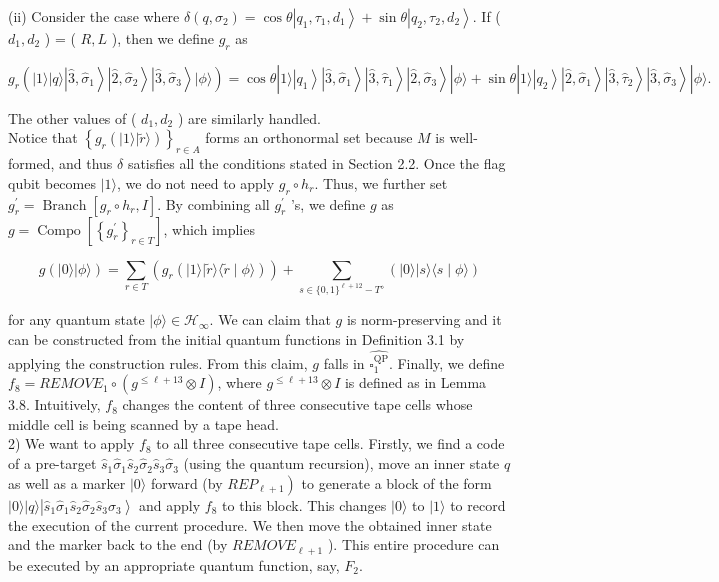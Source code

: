 \documentclass[10pt]{article}
\begin{document}
(ii) Consider the case where $\delta\left(q, \sigma_{2}\right)=\cos \theta\left|q_{1}, \tau_{1}, d_{1}\right\rangle+\sin \theta\left|q_{2}, \tau_{2}, d_{2}\right\rangle$. If ( $d_{1}, d_{2}$ ) = ( $R, L$ ), then we define $g_{r}$ as

$$
g_{r}\left(|1\rangle|q\rangle\left|\hat{3}, \hat{\sigma}_{1}\right\rangle\left|\hat{2}, \hat{\sigma}_{2}\right\rangle\left|\hat{3}, \hat{\sigma}_{3}\right\rangle|\phi\rangle\right)=\cos \theta|1\rangle\left|q_{1}\right\rangle\left|\hat{3}, \hat{\sigma}_{1}\right\rangle\left|\hat{3}, \hat{\tau}_{1}\right\rangle\left|\hat{2}, \hat{\sigma}_{3}\right\rangle|\phi\rangle+\sin \theta|1\rangle\left|q_{2}\right\rangle\left|\hat{2}, \hat{\sigma}_{1}\right\rangle\left|\hat{3}, \hat{\tau}_{2}\right\rangle\left|\hat{3}, \hat{\sigma}_{3}\right\rangle|\phi\rangle .
$$

The other values of ( $d_{1}, d_{2}$ ) are similarly handled.\\
Notice that $\left\{g_{r}(|1\rangle|\tilde{r}\rangle)\right\}_{r \in A}$ forms an orthonormal set because $M$ is well-formed, and thus $\delta$ satisfies all the conditions stated in Section 2.2. Once the flag qubit becomes $|1\rangle$, we do not need to apply $g_{r} \circ h_{r}$. Thus, we further set $g_{r}^{\prime}=\operatorname{Branch}\left[g_{r} \circ h_{r}, I\right]$. By combining all $g_{r}^{\prime}$ 's, we define $g$ as $g=\operatorname{Compo}\left[\left\{g_{r}^{\prime}\right\}_{r \in T}\right]$, which implies

$$
g(|0\rangle|\phi\rangle)=\sum_{r \in T}\left(g_{r}(|1\rangle|\tilde{r}\rangle\langle\tilde{r} \mid \phi\rangle)\right)+\sum_{s \in\{0,1\}^{\ell+12}-T^{\diamond}}(|0\rangle|s\rangle\langle s \mid \phi\rangle)
$$

for any quantum state $|\phi\rangle \in \mathcal{H}_{\infty}$. We can claim that $g$ is norm-preserving and it can be constructed from the initial quantum functions in Definition 3.1 by applying the construction rules. From this claim, $g$ falls in $\widehat{\square_{1}^{\mathrm{QP}}}$. Finally, we define $f_{8}=R E M O V E_{1} \circ\left(g^{\leq \ell+13} \otimes I\right)$, where $g^{\leq \ell+13} \otimes I$ is defined as in Lemma 3.8. Intuitively, $f_{8}$ changes the content of three consecutive tape cells whose middle cell is being scanned by a tape head.\\
2) We want to apply $f_{8}$ to all three consecutive tape cells. Firstly, we find a code of a pre-target $\hat{s}_{1} \hat{\sigma}_{1} \hat{s}_{2} \hat{\sigma}_{2} \hat{s}_{3} \hat{\sigma}_{3}$ (using the quantum recursion), move an inner state $q$ as well as a marker $|0\rangle$ forward (by $\left.R E P_{\ell+1}\right)$ to generate a block of the form $|0\rangle|q\rangle\left|\hat{s}_{1} \hat{\sigma}_{1} \hat{s}_{2} \hat{\sigma}_{2} \hat{s}_{3} \hat{\sigma}_{3}\right\rangle$ and apply $f_{8}$ to this block. This changes $|0\rangle$ to $|1\rangle$ to record the execution of the current procedure. We then move the obtained inner state and the marker back to the end (by $R E M O V E_{\ell+1}$ ). This entire procedure can be executed by an appropriate quantum function, say, $F_{2}$.
\end{document}
